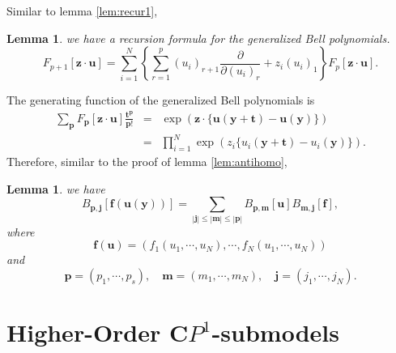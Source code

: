 \documentclass[makeidx,12pt,openany]{report}
\newtheorem{lem}[df]{Lemma}
\begin{document}
Similar to lemma \ref{lem:recur1}, 
\begin{lem}
 we have a recursion formula for the generalized Bell polynomials.
\begin{equation}
 F_{p+1}[\mathbf{z}\cdot \mathbf{u}]=
  \sum_{i=1}^N \left\{
   \sum_{r=1}^p (u_i)_{r+1} \frac{\partial}{\partial (u_i)_r}
    + z_i (u_i)_1 
  \right\} F_p[\mathbf{z}\cdot \mathbf{u}].
 \label{eqn:shift2}
\end{equation}
 \label{lem:recur2}
\end{lem}
The generating function of 
the generalized Bell polynomials is 
\begin{eqnarray}
 \sum_{\mathbf{p}}F_{\mathbf{p}}[\mathbf{z}\cdot \mathbf{u}]
 \frac{\mathbf{t}^{\mathbf{p}}}{\mathbf{p}!}
 &=& \exp ({\mathbf{z}\cdot\{ 
   \mathbf{u}(\mathbf{y}+\mathbf{t})-\mathbf{u}(\mathbf{y}) \} }) 
      \label{eqn:multigen} \\
 &=& \prod_{i=1}^N \exp (z_i \{ 
  u_i(\mathbf{y}+\mathbf{t})-u_i(\mathbf{y}) \} ). \nonumber 
\end{eqnarray}
Therefore, similar to the proof of lemma \ref{lem:antihomo}, 
\begin{lem}
we have
\begin{equation}
 B_{\mathbf{p,j}}[\mathbf{f}(\mathbf{u}(\mathbf{y}))]
  =\sum_{|\mathbf{j}| \le|\mathbf{m}| \le |\mathbf{p}|}
    B_{\mathbf{p,m}}[\mathbf{u}]B_{\mathbf{m,j}}[\mathbf{f}], 
 \label{eqn:genBell-Back}
\end{equation}
where 
$$
\mathbf{f}(\mathbf{u})=(f_1(u_1,\cdots,u_N),\cdots,f_N(u_1,\cdots,u_N))
$$
and 
$$
\mathbf{p}=(p_1,\cdots,p_s), \quad \mathbf{m}=(m_1,\cdots,m_N), \quad 
\mathbf{j}=(j_1,\cdots,j_N). 
$$
\end{lem}


\chapter{Higher-Order ${\mathbf{C}}P^1$-submodels}
\end{document}
